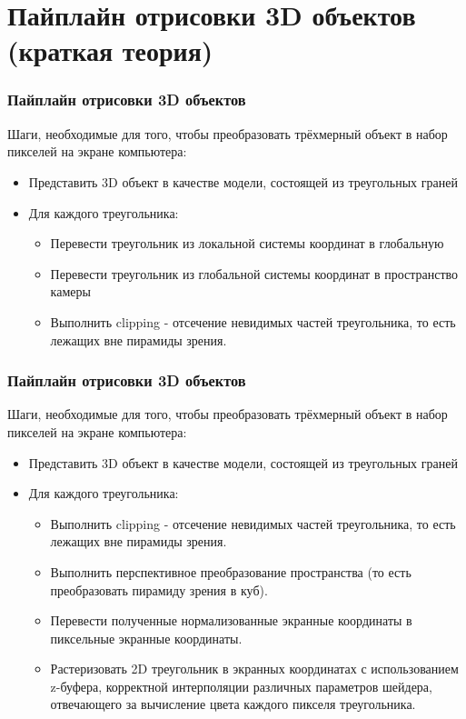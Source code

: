\documentclass{beamer}
\begin{document}
	\section{Пайплайн отрисовки 3D объектов (краткая теория)}
	\begin{frame}
		\frametitle{Пайплайн отрисовки 3D объектов}
		
		Шаги, необходимые для того, чтобы преобразовать трёхмерный объект в набор пикселей на экране компьютера: 
		
		\begin{itemize}
			\item<1-> Представить 3D объект в качестве модели, состоящей из треугольных граней
			\item<2-> Для каждого треугольника: 
			\begin{itemize}
				\item<3-> Перевести треугольник из локальной системы координат в глобальную
				\item<4-> Перевести треугольник из глобальной системы координат в пространство камеры
				\item<5-> Выполнить clipping - отсечение невидимых частей треугольника, то есть лежащих вне пирамиды зрения.
				
			\end{itemize}
		\end{itemize}
	\end{frame}

\begin{frame}
	\frametitle{Пайплайн отрисовки 3D объектов}
	
	Шаги, необходимые для того, чтобы преобразовать трёхмерный объект в набор пикселей на экране компьютера: 
	
	\begin{itemize}
		\item<1-> Представить 3D объект в качестве модели, состоящей из треугольных граней
		\item<1-> Для каждого треугольника: 
		\begin{itemize}
			\item<1-> Выполнить clipping - отсечение невидимых частей треугольника, то есть лежащих вне пирамиды зрения.
			\item<2-> Выполнить перспективное преобразование пространства (то есть преобразовать пирамиду зрения в куб).
			\item<3-> Перевести полученные нормализованные экранные координаты в пиксельные экранные координаты. 
			\item<4-> Растеризовать 2D треугольник в экранных координатах с использованием z-буфера, корректной интерполяции различных параметров шейдера, отвечающего за вычисление цвета каждого пикселя треугольника. 
			
		\end{itemize}
	\end{itemize}
\end{frame}
\end{document}
